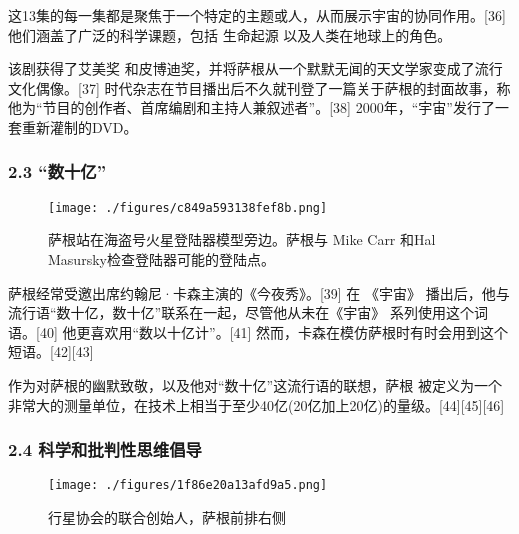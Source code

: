这13集的每一集都是聚焦于一个特定的主题或人，从而展示宇宙的协同作用。[36] 他们涵盖了广泛的科学课题，包括 生命起源 以及人类在地球上的角色。

该剧获得了艾美奖 和皮博迪奖，并将萨根从一个默默无闻的天文学家变成了流行文化偶像。[37] 时代杂志在节目播出后不久就刊登了一篇关于萨根的封面故事，称他为“节目的创作者、首席编剧和主持人兼叙述者”。[38] 2000年，“宇宙”发行了一套重新灌制的DVD。
\subsubsection{2.3 “数十亿”}
\begin{figure}[ht]
\centering
\texttt{[image: ./figures/c849a593138fef8b.png]}
\caption{萨根站在海盗号火星登陆器模型旁边。萨根与 Mike Carr 和Hal Masursky检查登陆器可能的登陆点。} \label{fig_Sagan_4}
\end{figure}
萨根经常受邀出席约翰尼·卡森主演的《今夜秀》。[39] 在 《宇宙》 播出后，他与流行语“数十亿，数十亿”联系在一起，尽管他从未在《宇宙》 系列使用这个词语。[40] 他更喜欢用“数以十亿计”。[41] 然而，卡森在模仿萨根时有时会用到这个短语。[42][43]

作为对萨根的幽默致敬，以及他对“数十亿”这流行语的联想，萨根 被定义为一个非常大的测量单位，在技术上相当于至少40亿(20亿加上20亿)的量级。[44][45][46]
\subsubsection{2.4 科学和批判性思维倡导}
\begin{figure}[ht]
\centering
\texttt{[image: ./figures/1f86e20a13afd9a5.png]}
\caption{行星协会的联合创始人，萨根前排右侧} \label{fig_Sagan_5}
\end{figure}